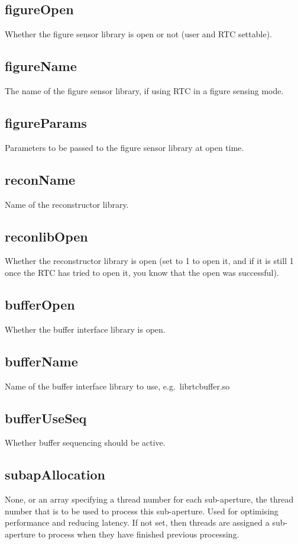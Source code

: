 \documentclass[a4,10pt]{article}
\begin{document}
\subsection{figureOpen}
Whether the figure sensor library is open or not (user and RTC
settable).

\subsection{figureName}
The name of the figure sensor library, if using RTC in a figure
sensing mode.

\subsection{figureParams}
Parameters to be passed to the figure sensor library at open time.

\subsection{reconName}
Name of the reconstructor library.



\subsection{reconlibOpen}
Whether the reconstructor library is open (set to 1 to open it, and if
it is still 1 once the RTC has tried to open it, you know that the
open was successful).

\subsection{bufferOpen}
Whether the buffer interface library is open.

\subsection{bufferName}
Name of the buffer interface library to use, e.g.\ librtcbuffer.so

\subsection{bufferUseSeq}
Whether buffer sequencing should be active.

\subsection{subapAllocation}
None, or an array specifying a thread number for each sub-aperture,
the thread number that is to be used to process this sub-aperture.
Used for optimising performance and reducing latency.  If not set,
then threads are assigned a sub-aperture to process when they have
finished previous processing.
\end{document}
